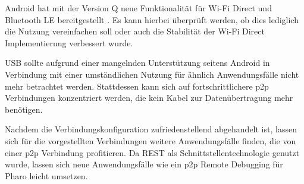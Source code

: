 Android hat mit der Version Q neue Funktionalität für Wi-Fi Direct und Bluetooth LE bereitgestellt \cite{androidQ}. Es kann hierbei überprüft werden, ob dies lediglich die Nutzung vereinfachen soll oder auch die Stabilität der Wi-Fi Direct Implementierung verbessert wurde.

USB sollte aufgrund einer mangelnden Unterstützung seitens Android in Verbindung mit einer umständlichen Nutzung für ähnlich Anwendungsfälle nicht mehr betrachtet werden. Stattdessen kann sich auf fortschrittlichere p2p Verbindungen konzentriert werden, die kein Kabel zur Datenübertragung mehr benötigen.

Nachdem die Verbindungskonfiguration zufriedenstellend abgehandelt ist, lassen sich für die vorgestellten Verbindungen weitere Anwendungsfälle finden, die von einer p2p Verbindung profitieren. Da REST als Schnittstellentechnologie genutzt wurde, lassen sich neue Anwendungsfälle wie ein p2p Remote Debugging für Pharo leicht umsetzen.